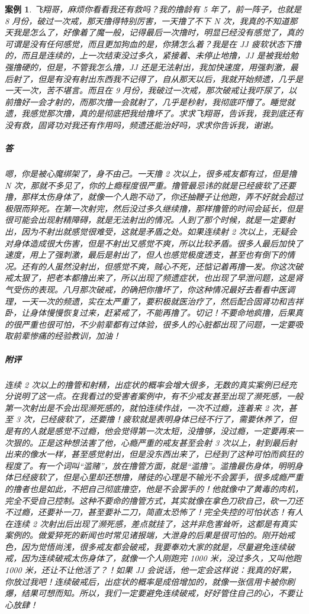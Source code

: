 \documentclass{ctexart}
\newtheorem{case}{案例}
\begin{document}
\begin{case}
    飞翔哥，麻烦你看看我还有救吗？我的撸龄有 5 年了，前一阵子，也就是 8 月份，破过一次戒，那天撸得特别厉害，一天撸了不下 N 次，我真的不知道那天我是怎么了，好像着了魔一般，记得最后一次撸时，明显已经没有感觉了，真的可谓是没有任何感觉，而且更加狗血的是，你猜怎么着？我是在 JJ 疲软状态下撸的，而且是连续的，上一次结束没过多久，紧接着、未停止地撸，JJ 是被我给勉强撸硬的，但是，不管我怎么撸，JJ 还是无法射出，我加快速度，用强刺激，最后射了，但是有没有射出东西我不记得了，自从那天以后，我就开始频遗，几乎是一天一次，苦不堪言。而且在 9 月份，我破过一次戒，那次破戒让我吓尿了，以前撸好一会才射的，而那次撸一会就射了，几乎是秒射，我彻底吓懵了。睡觉就遗，我感觉那次撸，真的是彻底把我给撸坏了。求求飞翔哥，告诉我，我到底还有没有救，固肾功对我还有作用吗，频遗还能治好吗，求求你告诉我，谢谢。
    \subparagraph{答} 嗯，你是被心魔绑架了，身不由己。一天撸 2 次以上，很多戒友都有过，但是撸 N 次，那就不多见了，你的上瘾程度很严重。撸管最忌讳的就是已经疲软了还要撸，那样太伤身体了，就像一个人跑不动了，你还抽鞭子让他跑，弄不好就会超过极限而猝死。在第一次射完，然后没过多久继续撸，那样撸管的时间会延长，但是很可能会出现射精障碍，就是无法射出的情况。人到了那个时候，就是一定要射出，因为不射出就感觉很难受，这就是矛盾之处。如果连续射 2 次以上，无疑会对身体造成很大伤害，但是不射出又感觉不爽，所以比较矛盾。很多人最后加快了速度，用上了强刺激，最后是射出了，但人也感觉极度透支，甚至也有倒下的情况。还有的人虽然没射出，但感觉不爽，贼心不死，还惦记着再撸一发。你这次破戒太狠了，把老本都撸出来了，所以出现了频遗症状，也出现了早泄问题，这是肾气受伤的表现。八月那次破戒，的确把你撸坏了，你这种情况最好去看看中医调理，一天一次的频遗，实在太严重了，要积极就医治疗了，然后配合固肾功和吉祥卧，让身体慢慢恢复过来，赶紧戒了，不能再撸了。切记！不要命地疯撸，后果真的很严重也很可怕，不少前辈都有过体验，很多人的心脏都出现了问题，一定要吸取前辈惨痛的经验教训，加油！
    \subparagraph{附评} 连续 2 次以上的撸管和射精，出症状的概率会增大很多，无数的真实案例已经充分说明了这一点。在我看过的受害者案例中，有不少戒友甚至出现了濒死感，一般第一次射出是不会出现濒死感的，就怕连续作战，一次不过瘾，连着来 2 次，甚至 3 次，已经疲软了，还要撸！疲软就是表明身体已经不行了，需要休养了，但是有的人就是感觉不过瘾，他会觉得第一次太短，没撸够，没过瘾，一定要再来一次狠的。正是这种想法害了他，心瘾严重的戒友甚至会射 3 次以上，射到最后射出来的像水一样，甚至感觉射出，但是没东西出来了，已经到了这种可怕而疯狂的程度了。有一个词叫“滥赌”，放在撸管方面，就是“滥撸”。滥撸最伤身体，明明身体已经疲软了，但是心里却还想撸，赌徒的心理是不输光不会罢手，很多成瘾严重的撸者也是如此，不把自己彻底撸空，他是不会罢手的！他就像中了黄毒的肉机，完全不受自己控制。这种不要命的撸管方式，其实就像在拿色刀砍自己，砍一刀还不过瘾，还要补一刀，甚至要补二刀，简直太恐怖了！完全失控的可怕状态！有人在连续 2 次射出后出现了濒死感，差点就挂了，这并非危害耸听，这都是有真实案例的。做爱猝死的新闻也时常见诸报端，大泄身的后果是很可怕的。刚开始戒色，因为觉悟尚浅，很多戒友都会破戒，我要奉劝大家的就是，尽量避免连续破戒，因为连续破戒太伤身体了，就像一个人刚跑完 1000 米，没过多久，又叫他跑 1000 米，还让不让他活了？！如果 JJ 会说话，他一定会这样说：我真的好累，你放过我吧！连续破戒后，出症状的概率是成倍增加的，就像一张信用卡被你刷爆，结果可想而知。所以，我们一定要避免连续破戒，好好管住自己的心，不要让心放肆！
\end{case}
\end{document}
